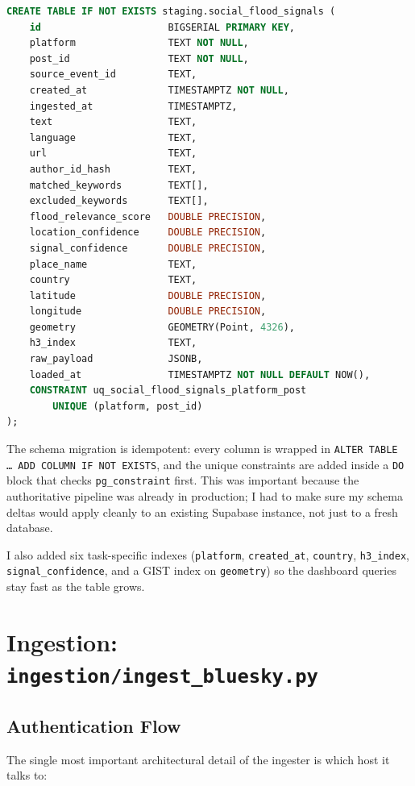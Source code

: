 \documentclass[11pt]{article}
\begin{document}
\begin{lstlisting}[language=SQL]
CREATE TABLE IF NOT EXISTS staging.social_flood_signals (
    id                      BIGSERIAL PRIMARY KEY,
    platform                TEXT NOT NULL,
    post_id                 TEXT NOT NULL,
    source_event_id         TEXT,
    created_at              TIMESTAMPTZ NOT NULL,
    ingested_at             TIMESTAMPTZ,
    text                    TEXT,
    language                TEXT,
    url                     TEXT,
    author_id_hash          TEXT,
    matched_keywords        TEXT[],
    excluded_keywords       TEXT[],
    flood_relevance_score   DOUBLE PRECISION,
    location_confidence     DOUBLE PRECISION,
    signal_confidence       DOUBLE PRECISION,
    place_name              TEXT,
    country                 TEXT,
    latitude                DOUBLE PRECISION,
    longitude               DOUBLE PRECISION,
    geometry                GEOMETRY(Point, 4326),
    h3_index                TEXT,
    raw_payload             JSONB,
    loaded_at               TIMESTAMPTZ NOT NULL DEFAULT NOW(),
    CONSTRAINT uq_social_flood_signals_platform_post
        UNIQUE (platform, post_id)
);
\end{lstlisting}

The schema migration is idempotent: every column is wrapped in
\texttt{ALTER TABLE \ldots\ ADD COLUMN IF NOT EXISTS}, and the unique
constraints are added inside a \texttt{DO} block that checks
\texttt{pg\_constraint} first. This was important because the
authoritative pipeline was already in production; I had to make sure my
schema deltas would apply cleanly to an existing Supabase instance, not
just to a fresh database.

I also added six task-specific indexes
(\texttt{platform}, \texttt{created\_at}, \texttt{country},
\texttt{h3\_index}, \texttt{signal\_confidence}, and a GIST index on
\texttt{geometry}) so the dashboard queries stay fast as the table grows.

\section{Ingestion: \texttt{ingestion/ingest\_bluesky.py}}

\subsection{Authentication Flow}

The single most important architectural detail of the ingester is which
host it talks to:
\end{document}
